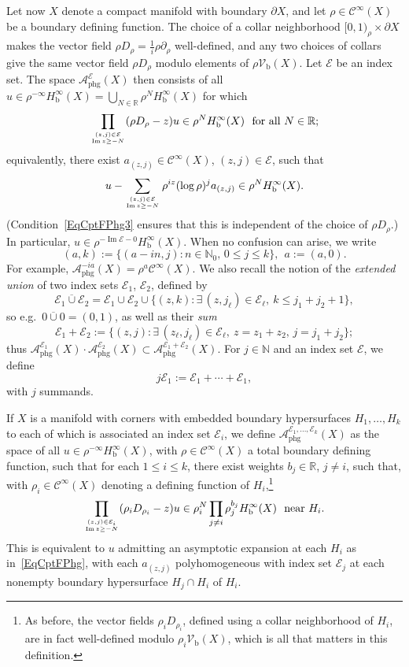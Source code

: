 \documentclass[reqno,11pt,letterpaper]{amsart}
\numberwithin{equation}{section}
\numberwithin{figure}{section}
\theoremstyle{definition}
\theoremstyle{remark}
\newcommand{\mc}{\mathcal}
\newcommand{\cA}{\mc A}
\newcommand{\cC}{\mc C}
\newcommand{\cE}{\mc E}
\newcommand{\N}{\mathbb{N}}
\newcommand{\R}{\mathbb{R}}
\renewcommand{\Im}{\operatorname{Im}}
\newcommand{\extcup}{\operatorname{\ol\cup}}
\newcommand{\ol}{\overline}
\newcommand{\pa}{\partial}
\newcommand{\tn}{\textnormal}
\newcommand{\bop}{{\mathrm{b}}}
\newcommand{\Vf}{\mathcal V}
\newcommand{\Vb}{\Vf_\bop}
\newcommand{\CI}{\cC^\infty}
\newcommand{\Hb}{H_{\bop}}
\newcommand{\phg}{{\mathrm{phg}}}
\begin{document}
Let now $X$ denote a compact manifold with boundary $\pa X$, and let $\rho\in\CI(X)$ be a boundary defining function. The choice of a collar neighborhood $[0,1)_\rho\times\pa X$ makes the vector field $\rho D_\rho=\frac{1}{i}\rho\pa_\rho$ well-defined, and any two choices of collars give the same vector field $\rho D_\rho$ modulo elements of $\rho\Vb(X)$. Let $\cE$ be an index set. The space $\cA_\phg^\cE(X)$ then consists of all $u\in\rho^{-\infty}\Hb^\infty(X)=\bigcup_{N\in\R}\rho^N\Hb^\infty(X)$ for which
\begin{equation}
\label{EqCptFTesting}
  \prod_{\genfrac{}{}{0pt}{}{(z,j)\in\cE}{\Im z\geq -N}} (\rho D_\rho-z)u\in\rho^N\Hb^\infty(X)\ \ \tn{for all}\ N\in\R;
\end{equation}
equivalently, there exist $a_{(z,j)}\in\CI(X)$, $(z,j)\in\cE$, such that
\begin{equation}
\label{EqCptFPhg}
  u - \sum_{\genfrac{}{}{0pt}{}{(z,j)\in\cE}{\Im z\geq -N}} \rho^{i z}(\log\rho)^j a_{(z,j)} \in\rho^N\Hb^\infty(X).
\end{equation}
(Condition~\eqref{EqCptFPhg3} ensures that this is independent of the choice of $\rho D_\rho$.) In particular, $u\in\rho^{-\Im\cE-0}\Hb^\infty(X)$. When no confusion can arise, we write
\begin{equation}
\label{EqCptFPhgShorthand}
  (a,k) := \{(a-i n,j)\colon n\in\N_0,\,0\leq j\leq k\},\ \ 
  a:=(a,0).
\end{equation}
For example, $\cA_\phg^{-i a}(X)=\rho^a\CI(X)$. We also recall the notion of the \emph{extended union} of two index sets $\cE_1$, $\cE_2$, defined by
\[
  \cE_1 \extcup \cE_2 = \cE_1 \cup \cE_2 \cup \{ (z,k) \colon \exists\,(z,j_\ell)\in \cE_\ell,\ k\leq j_1+j_2+1 \},
\]
so e.g.\ $0\extcup 0=(0,1)$, as well as their \emph{sum}
\[
  \cE_1+\cE_2 := \{ (z,j) \colon \exists\,(z_\ell,j_\ell)\in\cE_\ell,\ z=z_1+z_2,\,j=j_1+j_2 \};
\]
thus $\cA_\phg^{\cE_1}(X)\cdot\cA_\phg^{\cE_2}(X)\subset\cA_\phg^{\cE_1+\cE_2}(X)$. For $j\in\N$ and an index set $\cE$, we define
\[
  j\cE_1:=\cE_1+\cdots+\cE_1,
\]
with $j$ summands.

If $X$ is a manifold with corners with embedded boundary hypersurfaces $H_1,\ldots,H_k$ to each of which is associated an index set $\cE_i$, we define $\cA_\phg^{\cE_1,\ldots,\cE_k}(X)$ as the space of all $u\in\rho^{-\infty}\Hb^\infty(X)$, with $\rho\in\CI(X)$ a total boundary defining function, such that for each $1\leq i\leq k$, there exist weights $b_j\in\R$, $j\neq i$, such that, with $\rho_i\in\CI(X)$ denoting a defining function of $H_i$,\footnote{As before, the vector fields $\rho_i D_{\rho_i}$, defined using a collar neighborhood of $H_i$, are in fact well-defined modulo $\rho_i\Vb(X)$, which is all that matters in this definition.}
\[
  \prod_{\genfrac{}{}{0pt}{}{(z,j)\in\cE_i}{\Im z\geq-N}} (\rho_i D_{\rho_i}-z)u \in\rho_i^N\prod_{j\neq i}\rho_j^{b_j} \Hb^\infty(X)\ \ \tn{near}\ H_i.
\]
This is equivalent to $u$ admitting an asymptotic expansion at each $H_i$ as in~\eqref{EqCptFPhg}, with each $a_{(z,j)}$ polyhomogeneous with index set $\cE_j$ at each nonempty boundary hypersurface $H_j\cap H_i$ of $H_i$.
\end{document}
